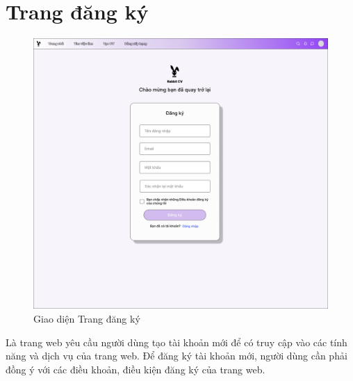 \section{Trang đăng ký}

\begin{figure}[H]
\begin{center}
    \includegraphics[scale=0.2]{img/Register.png}
    \caption{Giao diện Trang đăng ký}
\end{center}
\end{figure}

Là trang web yêu cầu người dùng tạo tài khoản mới để có truy cập vào các tính năng và dịch vụ của trang web. Để đăng ký tài khoản mới, người dùng cần phải đồng ý với các điều khoản, điều kiện đăng ký của trang web.

